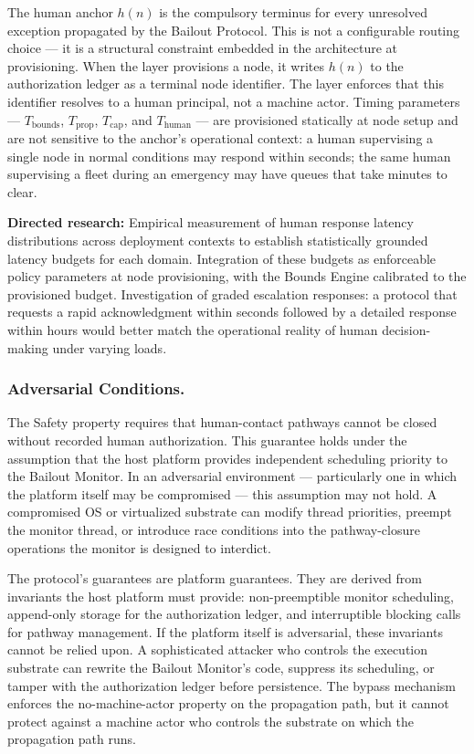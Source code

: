The human anchor $h(n)$ is the compulsory terminus for every unresolved exception propagated by the Bailout Protocol. This is not a configurable routing choice — it is a structural constraint embedded in the architecture at provisioning. When the \purpose{} layer provisions a node, it writes $h(n)$ to the authorization ledger as a terminal node identifier. The \fact{} layer enforces that this identifier resolves to a human principal, not a machine actor. Timing parameters — $T_{\mathrm{bounds}}$, $T_{\mathrm{prop}}$, $T_{\mathrm{cap}}$, and $T_{\mathrm{human}}$ — are provisioned statically at node setup and are not sensitive to the anchor's operational context: a human supervising a single node in normal conditions may respond within seconds; the same human supervising a fleet during an emergency may have queues that take minutes to clear.

\medskip\noindent\textbf{Directed research:} Empirical measurement of human response latency distributions across deployment contexts to establish statistically grounded latency budgets for each domain. Integration of these budgets as enforceable policy parameters at node provisioning, with the Bounds Engine calibrated to the provisioned budget. Investigation of graded escalation responses: a protocol that requests a rapid acknowledgment within seconds followed by a detailed response within hours would better match the operational reality of human decision-making under varying loads.

\subsubsection{Adversarial Conditions.}
The Safety property requires that human-contact pathways cannot be closed without recorded human authorization. This guarantee holds under the assumption that the host platform provides independent scheduling priority to the Bailout Monitor. In an adversarial environment — particularly one in which the platform itself may be compromised — this assumption may not hold. A compromised OS or virtualized substrate can modify thread priorities, preempt the monitor thread, or introduce race conditions into the pathway-closure operations the monitor is designed to interdict.

The protocol's guarantees are platform guarantees. They are derived from invariants the host platform must provide: non-preemptible monitor scheduling, append-only storage for the authorization ledger, and interruptible blocking calls for pathway management. If the platform itself is adversarial, these invariants cannot be relied upon. A sophisticated attacker who controls the execution substrate can rewrite the Bailout Monitor's code, suppress its scheduling, or tamper with the authorization ledger before persistence. The bypass mechanism enforces the no-machine-actor property on the propagation path, but it cannot protect against a machine actor who controls the substrate on which the propagation path runs.

